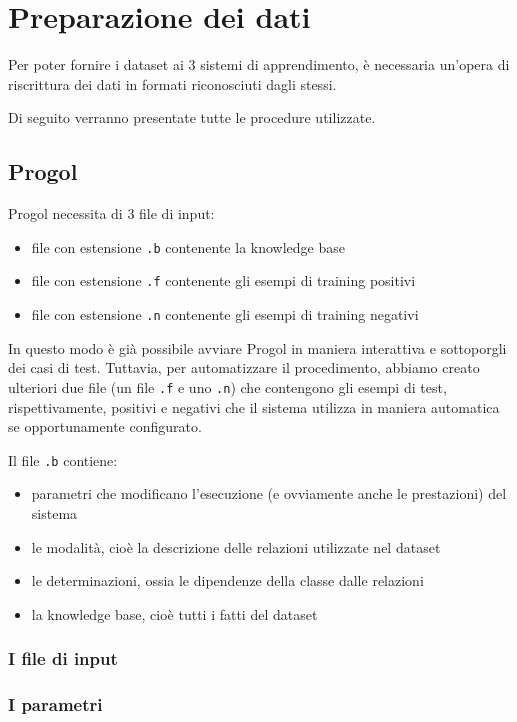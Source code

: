 \section{Preparazione dei dati}
Per poter fornire i dataset ai 3 sistemi di apprendimento, è necessaria un'opera di riscrittura dei dati in formati riconosciuti dagli stessi.

Di seguito verranno presentate tutte le procedure utilizzate.


\subsection{Progol}
\label{preparazione:progol}
Progol necessita di 3 file di input:
\begin{itemize}
\item file con estensione \verb+.b+ contenente la knowledge base
\item file con estensione \verb+.f+ contenente gli esempi di training positivi
\item file con estensione \verb+.n+ contenente gli esempi di training negativi
\end{itemize}

In questo modo è già possibile avviare Progol in maniera interattiva e sottoporgli dei casi di test. Tuttavia, per automatizzare il procedimento, abbiamo creato ulteriori due file (un file \verb+.f+ e uno \verb+.n+) che contengono gli esempi di test, rispettivamente, positivi e negativi che il sistema utilizza in maniera automatica se opportunamente configurato.

Il file \verb+.b+ contiene:
\begin{itemize}
\item parametri che modificano l'esecuzione (e ovviamente anche le prestazioni) del sistema
\item le modalità, cioè la descrizione delle relazioni utilizzate nel dataset
\item le determinazioni, ossia le dipendenze della classe dalle relazioni
\item la knowledge base, cioè tutti i fatti del dataset
\end{itemize}

\subsubsection*{I file di input}

\subsubsection*{I parametri}

